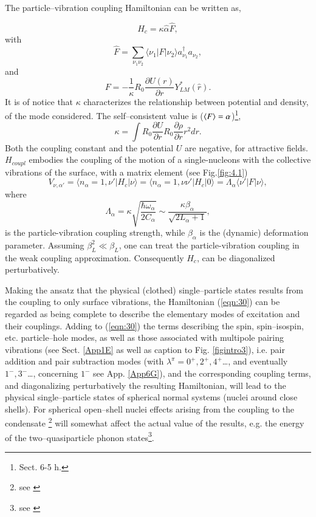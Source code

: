  
 
The particle--vibration coupling Hamiltonian can be written as,

\begin{equation}\label{eqintroD2}
H_{c} = \kappa \hat{\alpha} \hat{F} ,
\end{equation}
with
\begin{equation}
\hat{F} = \sum_{\nu_1 \nu_2} \langle \nu_1|F|\nu_2 \rangle a_{\nu_1}^{\dagger} a_{\nu_2} ,
\label{eqn:32}
\end{equation}
and
\begin{equation}
F = - \frac{1}{\kappa} R_0 \frac{\partial U(r)}{\partial r} Y_{LM}^* (\hat{r}) .
\label{eqn:33}
\end{equation}
It is of notice that $\kappa$ characterizes the relationship between potential and density, of the mode considered. The self--consistent value is ($\langle {F} \rangle=\alpha$)\footnote{\cite{Bohr:75} Sect. 6-5 h.}, 
\begin{equation}
\kappa=\int R_0\frac{\partial U}{\partial r}R_0\frac{\partial \rho}{\partial r}r^2dr.
\end{equation}
Both the coupling constant and the potential $U$ are negative, for attractive fields.
 $H_{coupl}$ embodies the coupling of the motion of a single-nucleons with the collective vibrations of the surface, with a matrix element (see Fig.\ref{fig:4.1})
\begin{equation}
V_{\nu,\alpha'}=\langle n_{\alpha} = 1, \nu' |H_{c}|\nu \rangle  = \langle n_{\alpha}=1, \nu\nu'|H_{c}|0 \rangle= \Lambda_{\alpha} \langle \nu' |F|\nu \rangle ,
\label{eqn:34}
\end{equation}
where
\begin{equation}\label{eqintroD6}
\Lambda_{\alpha} = \kappa \sqrt{\frac{\hbar\omega_{\alpha}}{2C_{\alpha}}} \sim \frac{\kappa \beta_{\alpha}}{\sqrt{2L_{\alpha}+1}} ,
\end{equation}
is the particle-vibration coupling strength, while $\beta_\alpha$ is the (dynamic) deformation parameter. Assuming $\beta_L^2 \ll \beta_L$, one can  treat the particle-vibration coupling in the weak coupling approximation. Consequently $H_{c}$, can be diagonalized perturbatively.

Making the ansatz that the physical (clothed) single--particle states results from the coupling to only surface vibrations, the Hamiltonian (\ref{eqn:30}) can be regarded as being complete to describe the elementary modes of excitation and their couplings. Adding to (\ref{eqn:30}) the terms describing the spin, spin--isospin, etc. particle--hole modes, as well as those associated with multipole pairing vibrations (see Sect. \ref{App1E} as well as caption to Fig. \ref{figintro3}), i.e. pair addition and pair subtraction modes (with $\lambda^\pi=0^+,2^+,4^+$\dots, and eventually $1^-,3^-$\dots, concerning $1^-$ see App. \ref{App6G}), and the corresponding coupling terms, and diagonalizing perturbatively the resulting Hamiltonian, will lead to the physical single--particle states of spherical normal systems (nuclei around close shells). For spherical open--shell nuclei effects arising from the coupling to the condensate \footnote{see \cite{Bes:90}} will somewhat  affect the actual value of the results, e.g. the energy of the two--quasiparticle phonon states\footnote{see \cite{Barranco:04}}.  
